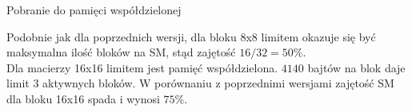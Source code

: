 \begin{enumerate}[(a)]
\begin{minipage}[c]{\textwidth}
\end{minipage}

\begin{minipage}[c]{\textwidth}

\item Pobranie do pamięci współdzielonej

\begin{center}
\begin{table}[H]
\centering
{}
\caption{Teoretyczna zajętość SM -- wersja 4. z pobraniem do pamięci współdzielonej.}
\end{table}
\end{center}

Podobnie jak dla poprzednich wersji, dla bloku 8x8 limitem okazuje się być maksymalna ilość bloków na SM, stąd zajętość $ 16 / 32 = 50\% $. \\
Dla macierzy 16x16 limitem jest pamięć współdzielona. $4140$ bajtów na blok daje limit $3$ aktywnych bloków. W porównaniu z poprzednimi wersjami zajętość SM dla bloku 16x16 spada i wynosi $ 75\% $. \\

\end{minipage}

\end{enumerate}


